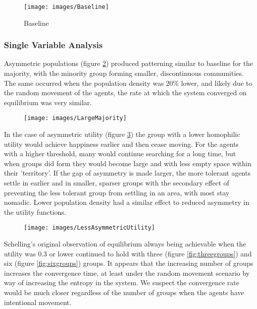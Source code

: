 \documentclass[sigplan,nonacm]{acmart}
\begin{document}
\begin{figure}
	\centering
	\texttt{[image: images/Baseline]}
	\caption{Baseline}
	\label{fig:baseline}
\end{figure}

\subsubsection{Single Variable Analysis}

Asymmetric populations (figure \ref{fig:largemajority}) produced patterning similar to baseline for the majority, 
with the minority group forming smaller, discontinuous communities. 
The same occurred when the population density was 20\% lower, and likely due to the random movement of the agents,
the rate at which the system converged on equilibrium was very similar.

\begin{figure}
	\centering
	\texttt{[image: images/LargeMajority]}
	\caption{}
	\label{fig:largemajority}
\end{figure}

In the case of asymmetric utility (figure \ref{fig:lessasymmetricutility}) the group with a lower homophilic utility
would achieve happiness earlier and then cease moving. For the agents with a higher threshold, many would continue searching for a long time,
but when groups did form they would become large and with less empty space within their 'territory'. 
If the gap of asymmetry is made larger, the more tolerant agents settle in earlier and in smaller, sparser groups with the secondary effect
of preventing the less tolerant group from settling in an area, with most stay nomadic.
Lower population density had a similar effect to reduced asymmetry in the utility functions.

\begin{figure}
	\centering
	\texttt{[image: images/LessAsymmetricUtility]}
	\caption{}
	\label{fig:lessasymmetricutility}
\end{figure}

Schelling's original observation of equilibrium always being achievable when the utility was 0.3 or lower continued to hold 
with three (figure \ref{fig:threegroups}) and six (figure \ref{fig:sixgroups}) groups. 
It appears that the increasing number of groups increases the convergence time, at least under the random movement
scenario by way of increasing the entropy in the system.
We suspect the convergence rate would be much closer regardless of the number of groups when the agents have intentional movement.
\end{document}
